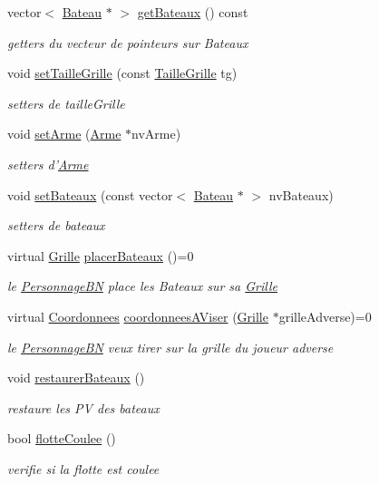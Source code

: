 \begin{DoxyCompactItemize}
vector$<$ \hyperlink{classBateau}{Bateau} $\ast$ $>$ \hyperlink{classPersonnageBN_a7f230cf0537de207fcc170f9663e8c6b}{get\-Bateaux} () const 
\begin{DoxyCompactList}\small\item\em getters du vecteur de pointeurs sur Bateaux \end{DoxyCompactList}\item 
void \hyperlink{classPersonnageBN_a41cd6da402ac37e5631942ca5156420c}{set\-Taille\-Grille} (const \hyperlink{classTailleGrille}{Taille\-Grille} tg)
\begin{DoxyCompactList}\small\item\em setters de taille\-Grille \end{DoxyCompactList}\item 
void \hyperlink{classPersonnageBN_a2d9befe652ed12cc68451a6855dac07e}{set\-Arme} (\hyperlink{classArme}{Arme} $\ast$nv\-Arme)
\begin{DoxyCompactList}\small\item\em setters d'\hyperlink{classArme}{Arme} \end{DoxyCompactList}\item 
void \hyperlink{classPersonnageBN_aded99fbc0a1314128d435ee8095d78b8}{set\-Bateaux} (const vector$<$ \hyperlink{classBateau}{Bateau} $\ast$ $>$ nv\-Bateaux)
\begin{DoxyCompactList}\small\item\em setters de bateaux \end{DoxyCompactList}\item 
virtual \hyperlink{classGrille}{Grille} \hyperlink{classPersonnageBN_a72b5b94a8e06f39c608c7310d4785579}{placer\-Bateaux} ()=0
\begin{DoxyCompactList}\small\item\em le \hyperlink{classPersonnageBN}{Personnage\-B\-N} place les Bateaux sur sa \hyperlink{classGrille}{Grille} \end{DoxyCompactList}\item 
virtual \hyperlink{classCoordonnees}{Coordonnees} \hyperlink{classPersonnageBN_aaf4e97d763adba22bc5a89b2537e6dbe}{coordonnees\-A\-Viser} (\hyperlink{classGrille}{Grille} $\ast$grille\-Adverse)=0
\begin{DoxyCompactList}\small\item\em le \hyperlink{classPersonnageBN}{Personnage\-B\-N} veux tirer sur la grille du joueur adverse \end{DoxyCompactList}\item 
void \hyperlink{classPersonnageBN_a6d8837669e41914b1494d040e455ee1d}{restaurer\-Bateaux} ()
\begin{DoxyCompactList}\small\item\em restaure les P\-V des bateaux \end{DoxyCompactList}\item 
bool \hyperlink{classPersonnageBN_ad8fb6423ac3e2b7f48348eb3b7a9992e}{flotte\-Coulee} ()
\begin{DoxyCompactList}\small\item\em verifie si la flotte est coulee \end{DoxyCompactList}\end{DoxyCompactItemize}


